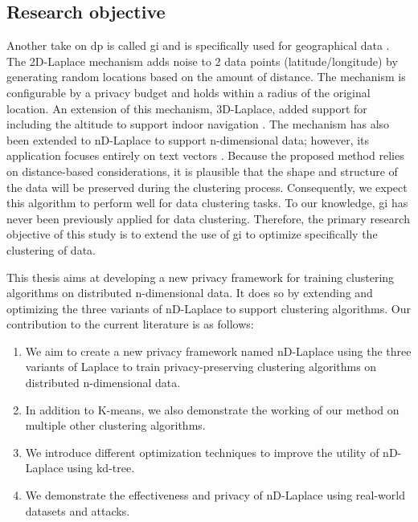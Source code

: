 \subsection*{Research objective}
Another take on \gls{dp} is called \gls{gi} and is specifically used for geographical data  \citep{DBLP:journals/corr/abs-1212-1984}.
The 2D-Laplace mechanism adds noise to 2 data points (latitude/longitude) by generating random locations based on the amount of distance.
The mechanism is configurable by a privacy budget and holds within a radius of the original location.
An extension of this mechanism, 3D-Laplace, added support for including the altitude to support indoor navigation \citep{9646489}.
The mechanism has also been extended to nD-Laplace to support n-dimensional data; however, its application focuses entirely on text vectors \citep{fernandes_generalised_2019}. \newline
Because the proposed method relies on distance-based considerations, it is plausible that the shape and structure of the data will be preserved during the clustering process.
Consequently, we expect this algorithm to perform well for data clustering tasks.
To our knowledge, \gls{gi} has never been previously applied for data clustering.
Therefore, the primary research objective of this study is to extend the use of \gls{gi} to optimize specifically the clustering of data. \newline

This thesis aims at developing a new privacy framework for training clustering algorithms on distributed n-dimensional data.
It does so by extending and optimizing the three variants of nD-Laplace to support clustering algorithms.
Our contribution to the current literature is as follows:
\begin{enumerate}
  \item We aim to create a new privacy framework named nD-Laplace using the three variants of Laplace to train privacy-preserving clustering algorithms on distributed n-dimensional data.
  \item In addition to K-means, we also demonstrate the working of our method on multiple other clustering algorithms.
  \item We introduce different optimization techniques to improve the utility of nD-Laplace using kd-tree.
  \item We demonstrate the effectiveness and privacy of nD-Laplace using real-world datasets and attacks.
\end{enumerate}

